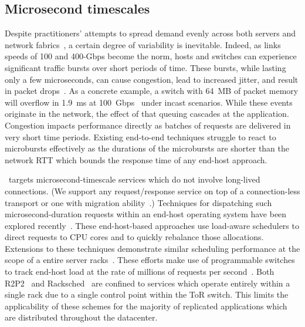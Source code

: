 \subsection{Microsecond timescales}

Despite practitioners' attempts to spread demand evenly across both
servers and network fabrics~\cite{facebook:sigcomm15}, a certain
degree of variability is inevitable.  Indeed, as links speeds of 100 and
400-Gbps become the norm, hosts and switches can experience
significant traffic bursts over short periods of time. These bursts,
while lasting only a few microseconds, can cause congestion, lead to
increased jitter, and result in packet
drops~\cite{facebook_microburst}. As a concrete example, a switch with
64~MB of packet memory will overflow in 1.9~ms at
100~Gbps~\cite{tofino2} under incast scenarios.  While these events
originate in the network, the effect of that queuing cascades at the
application. Congestion impacts performance directly as batches of
requests are delivered in very short time periods.  Existing
end-to-end techniques struggle to react to microbursts effectively as
the durations of the microbursts are shorter than the network RTT
which bounds the response time of any end-host approach.


\toolname\ targets microsecond-timescale services which
do not involve long-lived connections.
(We support any request/response service on top of a connection-less
transport or one with migration ability~\cite{crab,quic}.)  Techniques
for dispatching such microsecond-duration requests within an end-host
operating system have been explored recently~\cite{IX, shinjuku, snap,
  shenango, zygos}.  These end-host-based approaches use load-aware
schedulers to direct requests to CPU cores and to quickly rebalance
those allocations.  Extensions to these techniques demonstrate similar
scheduling performance at the scope of a entire server
racks~\cite{r2p2, racksched}. These efforts make use of programmable
switches to track end-host load at the rate of millions of requests
per second~\cite{tofino2}. Both R2P2~\cite{r2p2} and
Racksched~\cite{racksched} are confined to services which operate
entirely within a single rack due to a single control point within the
ToR switch. This limits the applicability of these schemes for the
majority of replicated applications which are distributed throughout
the datacenter.

